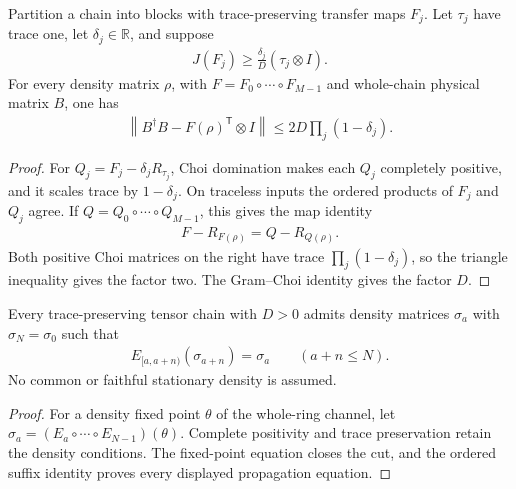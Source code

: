 \begin{lemma}
    \label{thm:ldp_transported_choi_residual}
    \leanok
    Partition a chain into blocks with trace-preserving transfer
    maps $F_j$. Let $\tau_j$ have trace one, let $\delta_j\in\mathbb R$,
    and suppose
    \begin{align}
        J(F_j)\ge\frac{\delta_j}{D}(\tau_j\otimes I).
    \end{align}
    For every density matrix $\rho$, with $F=F_0\circ\cdots\circ F_{M-1}$
    and whole-chain physical matrix $B$, one has
    \begin{align}
        \left\|B^\dagger B-F(\rho)^\mathsf T\otimes I\right\|
        \le 2D\prod_j(1-\delta_j).
    \end{align}
\end{lemma}
\begin{proof}\leanok
    For $Q_j=F_j-\delta_jR_{\tau_j}$, Choi domination makes each $Q_j$
    completely positive, and it scales trace by $1-\delta_j$. On
    traceless inputs the ordered products of $F_j$ and $Q_j$ agree.
    If $Q=Q_0\circ\cdots\circ Q_{M-1}$, this gives the map identity
    \begin{align}
        F-R_{F(\rho)}=Q-R_{Q(\rho)}.
    \end{align}
    Both positive Choi matrices on the right have trace
    $\prod_j(1-\delta_j)$, so the triangle inequality gives the factor
    two. The Gram--Choi identity gives the factor $D$.
\end{proof}

\begin{lemma}
    \label{thm:ldp_compatible_cyclic_densities}
    \leanok
    Every trace-preserving tensor chain with $D>0$ admits density
    matrices $\sigma_a$ with $\sigma_N=\sigma_0$ such that
    \begin{align}
        E_{[a,a+n)}(\sigma_{a+n})=\sigma_a
        \qquad(a+n\le N).
    \end{align}
    No common or faithful stationary density is assumed.
\end{lemma}
\begin{proof}\leanok
    For a density fixed point $\theta$ of the whole-ring channel,
    let $\sigma_a=(E_a\circ\cdots\circ E_{N-1})(\theta)$. Complete
    positivity and trace preservation retain the density conditions.
    The fixed-point equation closes the cut, and the ordered suffix
    identity proves every displayed propagation equation.
\end{proof}

